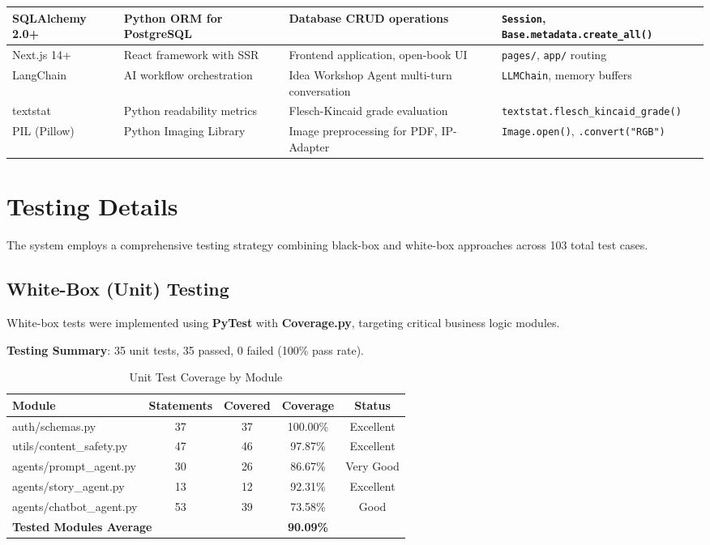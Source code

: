 \begin{table}[H]
{\begin{tabular}{|p{}|p{}|p{}|p{}|}
SQLAlchemy 2.0+ & Python ORM for PostgreSQL & Database CRUD operations & \texttt{Session}, \texttt{Base.metadata.create\_all()} \\ \hline
Next.js 14+ & React framework with SSR & Frontend application, open-book UI & \texttt{pages/}, \texttt{app/} routing \\ \hline
LangChain & AI workflow orchestration & Idea Workshop Agent multi-turn conversation & \texttt{LLMChain}, memory buffers \\ \hline
textstat & Python readability metrics & Flesch-Kincaid grade evaluation & \texttt{textstat.flesch\_kincaid\_grade()} \\ \hline
PIL (Pillow) & Python Imaging Library & Image preprocessing for PDF, IP-Adapter & \texttt{Image.open()}, \texttt{.convert("RGB")} \\ \hline
\end{tabular}%
}
\label{tab:external_apis}
\end{table}


\section{Testing Details}

The system employs a comprehensive testing strategy combining black-box and white-box approaches across 103 total test cases.

\subsection{White-Box (Unit) Testing}

White-box tests were implemented using \textbf{PyTest} with \textbf{Coverage.py}, targeting critical business logic modules.

\textbf{Testing Summary}: 35 unit tests, 35 passed, 0 failed (100\% pass rate).

\begin{table}[H]
\centering
\caption{Unit Test Coverage by Module}
\begin{tabular}{|l|c|c|c|c|}
\hline
\textbf{Module} & \textbf{Statements} & \textbf{Covered} & \textbf{Coverage} & \textbf{Status} \\ \hline
auth/schemas.py & 37 & 37 & 100.00\% & Excellent \\ \hline
utils/content\_safety.py & 47 & 46 & 97.87\% & Excellent \\ \hline
agents/prompt\_agent.py & 30 & 26 & 86.67\% & Very Good \\ \hline
agents/story\_agent.py & 13 & 12 & 92.31\% & Excellent \\ \hline
agents/chatbot\_agent.py & 53 & 39 & 73.58\% & Good \\ \hline
\multicolumn{3}{|l|}{\textbf{Tested Modules Average}} & \textbf{90.09\%} & \\ \hline
\end{tabular}
\label{tab:coverage}
\end{table}

